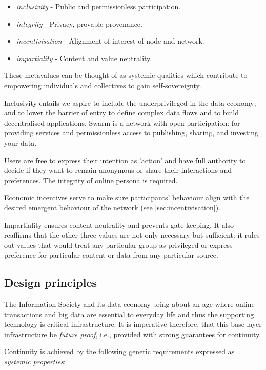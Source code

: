 \begin{itemize}
\item \emph{inclusivity} - Public and permissionless participation.  
\item \emph{integrity} - Privacy, provable provenance. 
\item \emph{incentivisation} - Alignment of interest of node and network.
\item \emph{impartiality} -  Content and value neutrality.  
\end{itemize}

These metavalues can be thought of as systemic qualities which contribute to empowering individuals and collectives to gain self-sovereignty.

Inclusivity entails we aspire to include the underprivileged in the data economy; and to lower the barrier of entry to define complex data flows and to build decentralised applications. Swarm is a network with open participation: for providing services and permissionless access to publishing, sharing, and investing your data.

Users are free to express their intention as 'action' and have full authority to decide if they want to remain anonymous or share their interactions and preferences. The integrity of online persona is required. 

Economic incentives serve to make sure participants' behaviour align with the desired emergent behaviour of the network (see \ref{sec:incentivisation}). 

Impartiality ensures content neutrality and prevents gate-keeping. It also reaffirms that the other three values are not only necessary but sufficient: it rules out values that would treat any particular group as privileged or express preference for particular content or data from any particular source. 

\subsection{Design principles \statusorange}\label{sec:design-principles}
 

The Information Society and its data economy bring about an age where online transactions and big data are essential to everyday life and thus the supporting technology is critical infrastructure. It is imperative therefore, that this base layer infrastructure be \emph{future proof}, i.e., provided with strong guarantees for continuity. 

Continuity is achieved by the following generic requirements expressed as \emph{systemic properties}:

